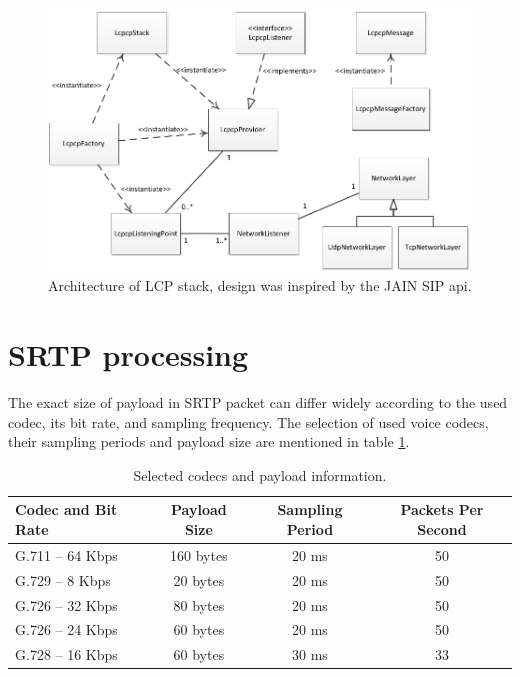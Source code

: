 \begin{figure}[H]
\centering
\includegraphics[width=14cm]{fig/lcpstack.pdf}
\caption{Architecture of LCP stack, design was inspired by the JAIN SIP 
api\cite{jainsip}.}
\label{oclpm}
\end{figure}

\section{SRTP processing}
The exact size of payload in SRTP packet can differ widely according to the 
used codec, its bit rate, and sampling frequency. The selection of used voice
codecs, their sampling periods and payload size are mentioned in table 
\ref{bandwidth}.

\begin{table}[H]
\begin{center}
\begin{tabular}{|l|ccc|}\hline%
  Codec and Bit Rate & Payload Size & Sampling Period & Packets Per Second\\\hline
  G.711 -- 64 Kbps   & 160 bytes    & 20 ms           & 50 \\
  G.729 -- 8 Kbps    & 20 bytes     & 20 ms           & 50 \\
  G.726 -- 32 Kbps   & 80 bytes     & 20 ms           & 50 \\
  G.726 -- 24 Kbps   & 60 bytes     & 20 ms           & 50 \\
  G.728 -- 16 Kbps   & 60 bytes     & 30 ms           & 33 \\
 \hline
\end{tabular}
\end{center}
\caption{Selected codecs and payload information.} %
\label{bandwidth}
\end{table}

